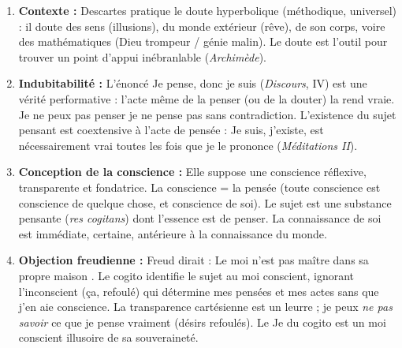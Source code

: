 \documentclass[11pt]{article}
\newcommand{\cle}[1]{{\popxbold\color{popdark}#1}}
\begin{document}
\begin{corrige}
\begin{enumerate}
\item \textbf{Contexte :} Descartes pratique le \cle{doute hyperbolique} (méthodique, universel) : il doute des sens (illusions), du monde extérieur (rêve), de son corps, voire des mathématiques (Dieu trompeur / génie malin). Le doute est l'outil pour trouver un point d'appui inébranlable (\emph{Archimède}).
\item \textbf{Indubitabilité :} L'énoncé \guillemotleft Je pense, donc je suis \guillemotright (\emph{Discours}, IV) est une \cle{vérité performative} : l'acte même de la penser (ou de la douter) la rend vraie. Je ne peux pas penser \guillemotleft je ne pense pas \guillemotright sans contradiction. L'existence du sujet pensant est coextensive à l'acte de pensée : \guillemotleft Je suis, j'existe, est nécessairement vrai toutes les fois que je le prononce \guillemotright (\emph{Méditations II}).
\item \textbf{Conception de la conscience :} Elle suppose une \cle{conscience réflexive, transparente et fondatrice}. La conscience = la pensée (toute conscience est conscience de quelque chose, et conscience de soi). Le sujet est une \cle{substance pensante} (\emph{res cogitans}) dont l'essence est de penser. La connaissance de soi est immédiate, certaine, antérieure à la connaissance du monde.
\item \textbf{Objection freudienne :} Freud dirait : \guillemotleft Le moi n'est pas maître dans sa propre maison \guillemotright. Le \cle{cogito} identifie le sujet au \cle{moi conscient}, ignorant l'\cle{inconscient} (ça, refoulé) qui détermine mes pensées et mes actes sans que j'en aie conscience. La transparence cartésienne est un leurre ; je peux \emph{ne pas savoir} ce que je pense vraiment (désirs refoulés). Le \guillemotleft Je \guillemotright du cogito est un moi conscient illusoire de sa souveraineté.
\end{enumerate}
\end{corrige}
\end{document}
